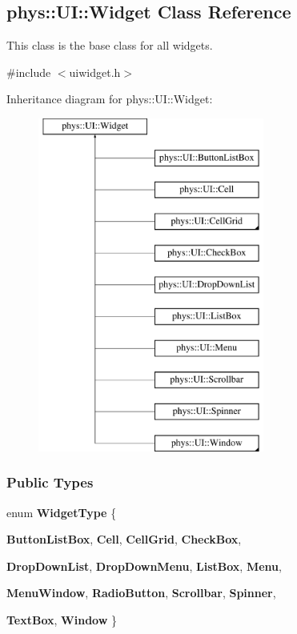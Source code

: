 \hypertarget{classphys_1_1UI_1_1Widget}{
\subsection{phys::UI::Widget Class Reference}
\label{classphys_1_1UI_1_1Widget}
}


This class is the base class for all widgets.  




{\ttfamily \#include $<$uiwidget.h$>$}

Inheritance diagram for phys::UI::Widget:\begin{figure}[H]
\begin{center}
\leavevmode
\includegraphics[height=11.000000cm]{classphys_1_1UI_1_1Widget}
\end{center}
\end{figure}
\subsubsection*{Public Types}
\begin{DoxyCompactItemize}
\item 
enum {\bfseries WidgetType} \{ \par
{\bfseries ButtonListBox}, 
{\bfseries Cell}, 
{\bfseries CellGrid}, 
{\bfseries CheckBox}, 
\par
{\bfseries DropDownList}, 
{\bfseries DropDownMenu}, 
{\bfseries ListBox}, 
{\bfseries Menu}, 
\par
{\bfseries MenuWindow}, 
{\bfseries RadioButton}, 
{\bfseries Scrollbar}, 
{\bfseries Spinner}, 
\par
{\bfseries TextBox}, 
{\bfseries Window}
 \}
\end{DoxyCompactItemize}
